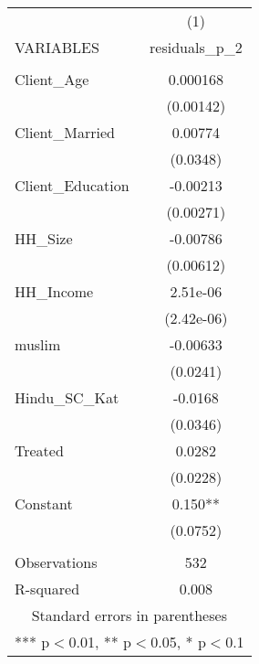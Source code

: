 \begin{tabular}{lc} \hline
 & (1) \\
VARIABLES & residuals\_p\_2 \\ \hline
 &  \\
Client\_Age & 0.000168 \\
 & (0.00142) \\
Client\_Married & 0.00774 \\
 & (0.0348) \\
Client\_Education & -0.00213 \\
 & (0.00271) \\
HH\_Size & -0.00786 \\
 & (0.00612) \\
HH\_Income & 2.51e-06 \\
 & (2.42e-06) \\
muslim & -0.00633 \\
 & (0.0241) \\
Hindu\_SC\_Kat & -0.0168 \\
 & (0.0346) \\
Treated & 0.0282 \\
 & (0.0228) \\
Constant & 0.150** \\
 & (0.0752) \\
 &  \\
Observations & 532 \\
 R-squared & 0.008 \\ \hline
\multicolumn{2}{c}{ Standard errors in parentheses} \\
\multicolumn{2}{c}{ *** p$<$0.01, ** p$<$0.05, * p$<$0.1} \\
\end{tabular}
